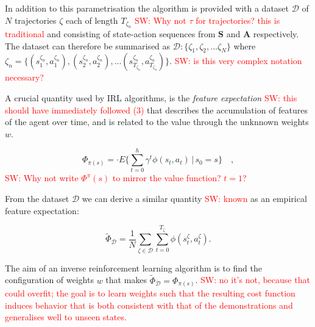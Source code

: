 \documentclass[letterpaper]{article}
\newcommand{\sw}[1]{\textcolor{red}{SW: #1}}
\begin{document}
In addition to this parametrisation the algorithm is provided with a dataset ${\mathcal{D}}$ of $N$ trajectories $\zeta$ each of length $T_{\zeta_n}$ \sw{Why not $\tau$ for trajectories? this is traditional} and consisting of state-action sequences from $\mathbf{S}$ and $\mathbf{A}$ respectively. The dataset can therefore be summarised as $\mathcal{D}:\big\{ \zeta_1,\zeta_2,...\zeta_N \big\}$ where $\zeta_n = \{(s^{\zeta_n}_1,a^{\zeta_n}_1),(s^{\zeta_n}_2,a^{\zeta_n}_2),...(s^{\zeta_n}_{T_{\zeta_n}},a^{\zeta_n}_{T_{\zeta_n}})\}$. \sw{is this very complex notation necessary?}

A crucial quantity used by IRL algorithms, is the \emph{feature expectation} \sw{this should have immediately followed (3)} that describes the accumulation of features of the agent over time, and is related to the value through the unknnown weights $w$. 

\begin{equation}
 	\Phi_{\pi(s)} = \cdot E\{\sum_{t = 0}^h \gamma^t\phi(s_t,a_t)\,\vert\, s_0 = s\}\quad, \label{eqn:model_fe}
\end{equation}
\sw{Why not write $\Phi^\pi(s)$ to mirror the value function? $t=1$?}

From the dataset ${\mathcal{D}}$ we can derive a similar quantity \sw{known} as an empirical feature expectation:

\begin{equation}
	\widetilde{\Phi}_{\mathcal{D}} =\frac{1}{N}\sum_{\zeta\in\mathcal{D}}\sum_{t=0}^{T_{\zeta}}\phi(s^\zeta_t,a^\zeta_t). \label{eqn:empirical_fe}
\end{equation}

The aim of an inverse reinforcement learning algorithm is to find the configuration of weights $w$ that makes $\widetilde{\Phi}_{\mathcal{D}} = \Phi_{\pi(s)}$. \sw{no it's not, because that could overfit; the goal is to learn weights such that the resulting cost function induces behavior that is both consistent with that of the demonstrations and generalises well to unseen states.}
\end{document}
